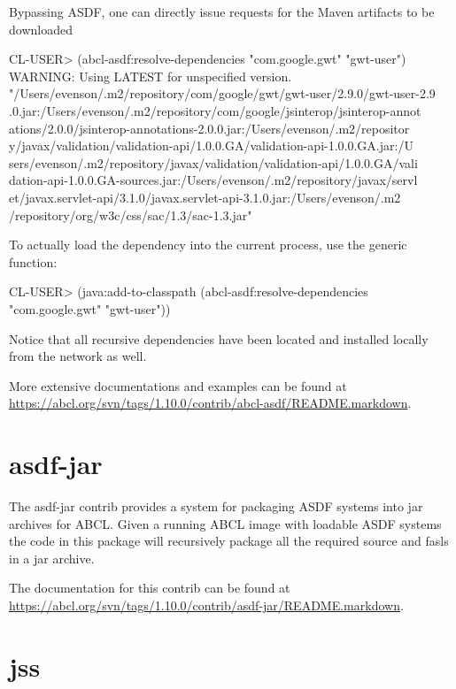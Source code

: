 \documentclass[10pt]{book}
\begin{document}
Bypassing \textsc{ASDF}, one can directly issue requests for the Maven
artifacts to be downloaded

\begin{listing-lisp}
CL-USER> (abcl-asdf:resolve-dependencies "com.google.gwt"
                                         "gwt-user")
WARNING: Using LATEST for unspecified version.
"/Users/evenson/.m2/repository/com/google/gwt/gwt-user/2.9.0/gwt-user-2.9
.0.jar:/Users/evenson/.m2/repository/com/google/jsinterop/jsinterop-annot
ations/2.0.0/jsinterop-annotations-2.0.0.jar:/Users/evenson/.m2/repositor
y/javax/validation/validation-api/1.0.0.GA/validation-api-1.0.0.GA.jar:/U
sers/evenson/.m2/repository/javax/validation/validation-api/1.0.0.GA/vali
dation-api-1.0.0.GA-sources.jar:/Users/evenson/.m2/repository/javax/servl
et/javax.servlet-api/3.1.0/javax.servlet-api-3.1.0.jar:/Users/evenson/.m2
/repository/org/w3c/css/sac/1.3/sac-1.3.jar"
\end{listing-lisp}

To actually load the dependency into the current process, use the
 generic function:

\begin{listing-lisp}
CL-USER> (java:add-to-classpath
          (abcl-asdf:resolve-dependencies "com.google.gwt"
                                          "gwt-user"))
\end{listing-lisp}

Notice that all recursive dependencies have been located and installed
locally from the network as well.

More extensive documentations and examples can be found at
\url{https://abcl.org/svn/tags/1.10.0/contrib/abcl-asdf/README.markdown}.

\section{asdf-jar}
\label{section:asdf-jar}

The asdf-jar contrib provides a system for packaging \textsc{ASDF}
systems into jar archives for \textsc{ABCL}.  Given a running
\textsc{ABCL} image with loadable \textsc{ASDF} systems the code in
this package will recursively package all the required source and
fasls in a jar archive.

The documentation for this contrib can be found at
\url{https://abcl.org/svn/tags/1.10.0/contrib/asdf-jar/README.markdown}.

\section{jss}
\label{section:jss}
\end{document}
